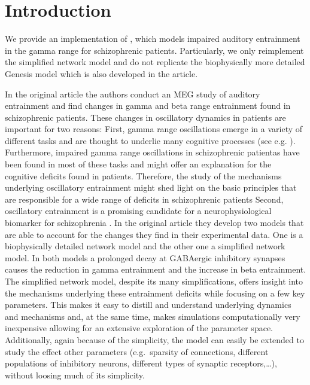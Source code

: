\documentclass[10pt,a4paper,onecolumn]{article}
\begin{document}
\section{Introduction}\label{introduction}

We provide an implementation of \autocite{Vierling2008}, which models
impaired auditory entrainment in the gamma range for schizophrenic
patients. Particularly, we only reimplement the simplified network model
and do not replicate the biophysically more detailed Genesis model which
is also developed in the article.

In the original article the authors conduct an MEG study of auditory
entrainment and find changes in gamma and beta range entrainment found
in schizophrenic patients. These changes in oscillatory dynamics in
patients are important for two reasons: First, gamma range oscillations
emerge in a variety of different tasks and are thought to underlie many
cognitive processes (see e.g. \autocite{Fries2005,Fries2015}). Furthermore, impaired gamma
range oscillations in schizophrenic patientas have been found in most of
these tasks and might offer an explanation for the cognitive deficits
found in patients. Therefore, the study of the mechanisms underlying
oscillatory entrainment might shed light on the basic principles that
are responsible for a wide range of deficits in schizophrenic patients
Second, oscillatory entrainment is a promising candidate for a
neurophysiological biomarker for schizophrenia
\autocite{Siekmeier2015}. In the original article they develop two
models that are able to account for the changes they find in their
experimental data. One is a biophysically detailed network model and the
other one a simplified network model. In both models a prolonged decay
at GABAergic inhibitory synapses causes the reduction in gamma
entrainment and the increase in beta entrainment. The simplified network
model, despite its many simplifications, offers insight into the
mechanisms underlying these entrainment deficits while focusing on a few
key parameters. This makes it easy to distill and understand underlying
dynamics and mechanisms and, at the same time, makes simulations
computationally very inexpensive allowing for an extensive exploration
of the parameter space. Additionally, again because of the simplicity,
the model can easily be extended to study the effect other parameters
(e.g.~sparsity of connections, different populations of inhibitory
neurons, different types of synaptic receptors,\ldots{}), without
loosing much of its simplicity.
\end{document}
